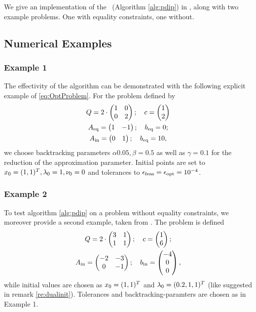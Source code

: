 We give an implementation of the \pdm \ (Algorithm \ref{alg:pdip}) in \matlab, along with two example problems. One with equality constraints, one without.

\subsection{Numerical Examples}
\subsubsection{Example 1}
The effectivity of the algorithm can be demonstrated with the following explicit example of \eqref{eq:OptProblem}. For the problem defined by
\begin{gather*}
	Q = 2\cdot \begin{pmatrix}
	1 & 0\\ 0 & 2
\end{pmatrix}; \quad c = \begin{pmatrix} {1} \\ {2} \end{pmatrix}\\
{A}_{\mathrm{eq}}= \begin{pmatrix}
1 & -1
\end{pmatrix};\quad {b}_{\mathrm{eq}}= 0;\\
{A}_{\mathrm{{ in}}} = \begin{pmatrix}
0 & 1
\end{pmatrix}; \quad {b}_{\mathrm{eq}}= 10,
\end{gather*}
we choose backtracking parameters $ \alpha 0.05,\beta = 0.5 $ as well as $ \gamma = 0.1 $ for the reduction of the approximation parameter. Initial points are set to $ x_0 = (1,1)^T, \lambda_0 = 1, \nu_0 = 0 $ and tolerances to $ {\epsilon}_{\mathrm{feas}} = {\epsilon}_{\mathrm{opt}} = 10^{-4} $.
\subsubsection{Example 2 }
To test algorithm \eqref{alg:pdip} on a problem without equality constraints, we moreover provide a second example, taken from \cite{EX}. The problem is defined
\begin{gather*}
		Q = 2\cdot \begin{pmatrix}
	3 & 1\\ 1 & 1
	\end{pmatrix}; \quad c = \begin{pmatrix} {1} \\ {6} \end{pmatrix};\\
	{A}_{\mathrm{{ in}}} = \begin{pmatrix}
	-2 & -3 \\ 0& -1
	\end{pmatrix}; \quad {b}_{\mathrm{{ in}}}= \begin{pmatrix}
	-4\\0\\0
	\end{pmatrix},
\end{gather*}
while initial values are chosen as $ x_0 = (1,1)^T $ and $ \lambda_0 = (0.2,1,1)^T $ (like suggested in remark \ref{re:dualinit}). Tolerances and backtracking-paramters are chosen as in Example 1.

